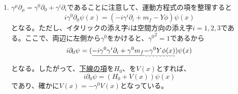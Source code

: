 \documentclass[unicode,a4paper,10pt]{ltjsarticle}
\begin{document}
\begin{enumerate}
  \item
        $\gamma^{\mu}\partial_{\mu}=\gamma^{0}\partial_{0}+\gamma^{i}\partial_{i}$であることに注意して、運動方程式の項を整理すると
        \begin{equation}
          i\gamma^{0}\partial_{0}\psi(x)
          =
          (-i\gamma^{i}\partial_{i}+m_{f}-Y\phi)\psi(x)
        \end{equation}
        となる。ただし、イタリックの添え字$i$は空間方向の添え字$i=1,2,3$である。ここで、両辺に左側から$\gamma^{0}$をかけると、${\gamma^{0}}^2=1$であるから
        \begin{equation}
          i\partial_{0}\psi
          =
          (
          \uline{-i\gamma^{0}\gamma^{i}\partial_{i}
          +
          \gamma^{0}m_{f}
          }
          \uwave{
            -
            \gamma^{0}Y\phi(x)
          }
          )\psi(x)
        \end{equation}
        となる。したがって、\uline{下線の項}を$H_{0}$、を$V(x)$とすれば、
        \begin{equation}
          i\partial_{0}\psi
          =
          (
          H_{0}
          +
          V(x)
          )\psi(x)
        \end{equation}
        であり、確かに$V(x)=-\gamma^{0}V(x)$となっている。



\end{enumerate}
\end{document}
